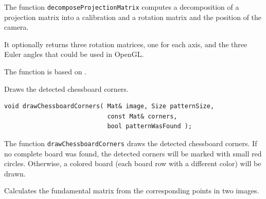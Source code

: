 The function \texttt{decomposeProjectionMatrix} computes a decomposition of a projection matrix into a calibration and a rotation matrix and the position of the camera.

It optionally returns three rotation matrices, one for each axis, and the three Euler angles that could be used in OpenGL.

The function is based on .

\label{drawChessboardCorners}
Draws the detected chessboard corners.

\begin{lstlisting}
void drawChessboardCorners( Mat& image, Size patternSize,
                            const Mat& corners,
                            bool patternWasFound );
\end{lstlisting}
\begin{description}
\end{description}

The function \texttt{drawChessboardCorners} draws the detected chessboard corners. If no complete board was found, the detected corners will be marked with small red circles. Otherwise, a colored board (each board row with a different color) will be drawn.

\label{findFundamentalMat}
Calculates the fundamental matrix from the corresponding points in two images.


